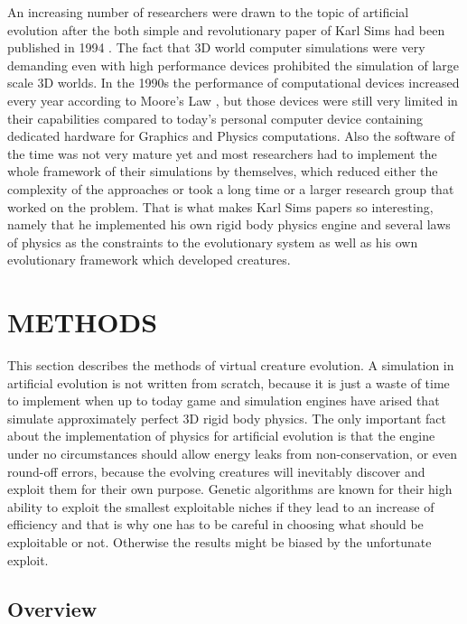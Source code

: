 \documentclass[letterpaper, 10 pt, conference]{ieeeconf}  %
\begin{document}
An increasing number of researchers were drawn to the topic of artificial evolution after the both simple and revolutionary paper of Karl Sims had been published in 1994 \cite{Sims1994}. The fact that 3D world computer simulations were very demanding even with high performance devices prohibited the simulation of large scale 3D worlds. In the 1990s the performance of computational devices increased every year according to Moore's Law \cite{Moore1965}, but those devices were still very limited in their capabilities compared to today's personal computer device containing dedicated hardware for Graphics and Physics computations. Also the software of the time was not very mature yet and most researchers had to implement the whole framework of their simulations by themselves, which reduced either the complexity of the approaches or took a long time or a larger research group that worked on the problem. That is what makes Karl Sims papers so interesting, namely that he implemented his own rigid body physics engine and several laws of physics as the constraints to the evolutionary system as well as his own evolutionary framework which developed creatures.

\section{METHODS}

This section describes the methods of virtual creature evolution. A simulation in artificial evolution is not written from scratch, because it is just a waste of time to implement when up to today game and simulation engines have arised that simulate approximately perfect 3D rigid body physics. The only important fact about the implementation of physics for artificial evolution is that the engine under no circumstances should allow energy leaks from non-conservation, or even round-off errors, because the evolving creatures will inevitably discover and exploit them for their own purpose. Genetic algorithms are known for their high ability to exploit the smallest exploitable niches if they lead to an increase of efficiency and that is why one has to be careful in choosing what should be exploitable or not. Otherwise the results might be biased by the unfortunate exploit.
\subsection{Overview}
\end{document}
